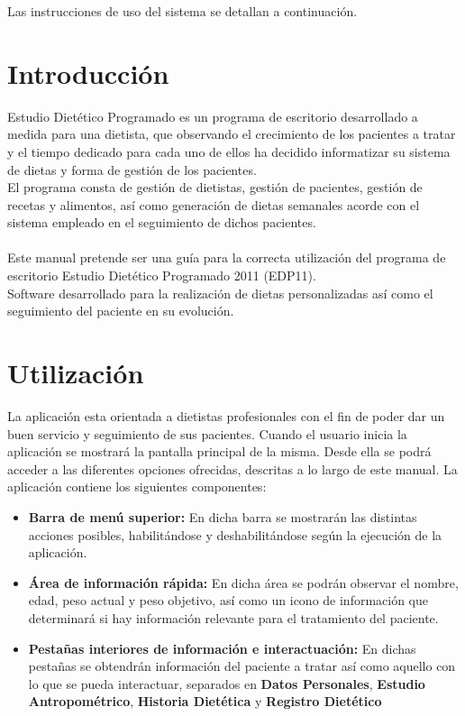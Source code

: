 

Las instrucciones de uso del sistema se detallan a continuación.

\section{Introducción}
Estudio Dietético Programado es un programa de escritorio desarrollado a medida para una dietista, que observando el crecimiento de los pacientes a tratar y el tiempo dedicado para cada uno de ellos ha decidido informatizar su sistema de dietas y forma de gestión de los pacientes.\\
El programa consta de gestión de dietistas, gestión de pacientes, gestión de recetas y alimentos, así como generación de dietas semanales acorde con el sistema empleado en el seguimiento de dichos pacientes.\\
\\
Este manual pretende ser una guía para la correcta utilización del programa
de escritorio Estudio Dietético Programado 2011 (EDP11).\\
Software desarrollado para la realización de dietas personalizadas así
como el seguimiento del paciente en su evolución.\\

\section{Utilización}
La aplicación esta orientada a dietistas profesionales con el fin de poder dar un buen servicio y seguimiento de sus pacientes.
Cuando el usuario inicia la aplicación se mostrará la pantalla principal de la misma. Desde ella se podrá acceder a las diferentes opciones ofrecidas, descritas a lo largo de este manual.
La aplicación contiene los siguientes componentes:
\begin{itemize}
\item \textbf{Barra de menú superior:} En dicha barra se mostrarán las distintas acciones posibles, habilitándose y deshabilitándose según la ejecución de la aplicación.
\item \textbf{Área de información rápida:} En dicha área se podrán observar el nombre, edad, peso actual y peso objetivo, así como un icono de información que determinará si hay información relevante para el tratamiento del paciente.
\item \textbf{Pestañas interiores de información e interactuación:} En dichas pestañas se obtendrán información del paciente a tratar así como aquello con lo que se pueda interactuar, separados en \textbf{Datos Personales}, \textbf{Estudio Antropométrico}, \textbf{Historia Dietética} y \textbf{Registro Dietético}
\end{itemize}


